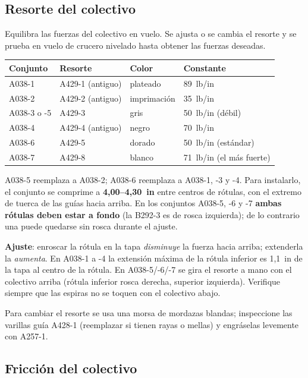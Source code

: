 \subsection{Resorte del colectivo}

Equilibra las fuerzas del colectivo en vuelo. Se ajusta o se cambia el resorte y se prueba en vuelo de crucero nivelado hasta obtener las fuerzas deseadas.

\begin{center}
\small
\begin{tabular}{@{}llll@{}}
\toprule
Conjunto & Resorte & Color & Constante \\
\midrule
A038-1 & A429-1 (antiguo) & plateado & 89~lb/in \\
A038-2 & A429-2 (antiguo) & imprimación & 35~lb/in \\
A038-3 o -5 & A429-3 & gris & 50~lb/in (débil) \\
A038-4 & A429-4 (antiguo) & negro & 70~lb/in \\
A038-6 & A429-5 & dorado & 50~lb/in (estándar) \\
A038-7 & A429-8 & blanco & 71~lb/in (el más fuerte) \\
\bottomrule
\end{tabular}
\end{center}

A038-5 reemplaza a A038-2; A038-6 reemplaza a A038-1, -3 y -4. Para instalarlo, el conjunto se comprime a \textbf{4,00--4,30~in} entre centros de rótulas, con el extremo de tuerca de las guías hacia arriba. En los conjuntos A038-5, -6 y -7 \textbf{ambas rótulas deben estar a fondo} (la B292-3 es de rosca izquierda); de lo contrario una puede quedarse sin rosca durante el ajuste.

\textbf{Ajuste}: enroscar la rótula en la tapa \emph{disminuye} la fuerza hacia arriba; extenderla la \emph{aumenta}. En A038-1 a -4 la extensión máxima de la rótula inferior es 1,1~in de la tapa al centro de la rótula. En A038-5/-6/-7 se gira el resorte a mano con el colectivo arriba (rótula inferior rosca derecha, superior izquierda). Verifique siempre que las espiras no se toquen con el colectivo abajo.

Para cambiar el resorte se usa una morsa de mordazas blandas; inspeccione las varillas guía A428-1 (reemplazar si tienen rayas o mellas) y engráselas levemente con A257-1.

\subsection{Fricción del colectivo}

